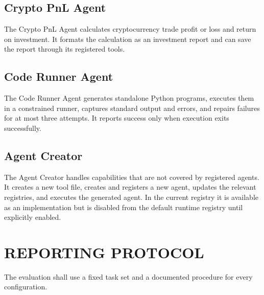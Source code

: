 \subsection{Crypto PnL Agent}
The Crypto PnL Agent calculates cryptocurrency trade profit or loss and return
on investment. It formats the calculation as an investment report and can save
the report through its registered tools.

\subsection{Code Runner Agent}
The Code Runner Agent generates standalone Python programs, executes them in a
constrained runner, captures standard output and errors, and repairs failures
for at most three attempts. It reports success only when execution exits
successfully.

\subsection{Agent Creator}
The Agent Creator handles capabilities that are not covered by registered
agents. It creates a new tool file, creates and registers a new agent, updates
the relevant registries, and executes the generated agent. In the current
registry it is available as an implementation but is disabled from the default
runtime registry until explicitly enabled.

\fi
\section{\uppercase{Reporting Protocol}}
The evaluation shall use a fixed task set and a documented procedure for every configuration.

